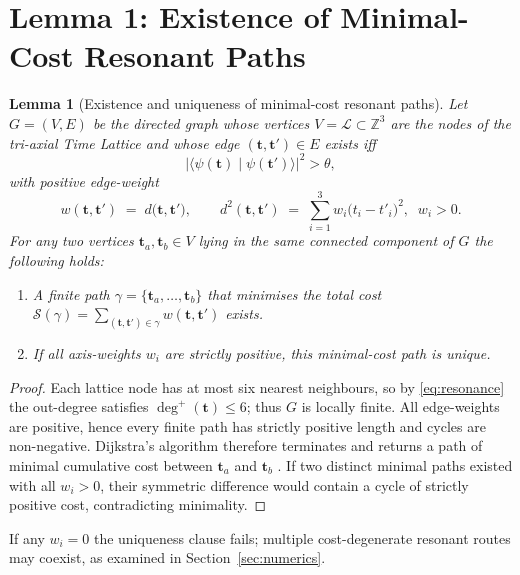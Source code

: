 \documentclass[11pt]{article}
\newtheorem{lemma}{Lemma}
\begin{document}
\section{Lemma 1: Existence of Minimal-Cost Resonant Paths}\label{sec:lemma1}

\begin{lemma}[Existence and uniqueness of minimal-cost resonant paths]\label{lem:minpath}
Let \(G=(V,E)\) be the directed graph whose vertices
\(V=\mathcal L\subset\mathbb Z^{3}\) are the nodes of the tri-axial Time Lattice and
whose edge \((\mathbf t,\mathbf t')\in E\) exists \emph{iff}
\begin{equation}
  \bigl|\langle\psi(\mathbf t)\mid\psi(\mathbf t')\rangle\bigr|^{2}>\theta,
  \label{eq:resonance}
\end{equation}
with positive edge-weight
\[
  w(\mathbf t,\mathbf t') \;=\; d\!\bigl(\mathbf t,\mathbf t'\bigr), 
  \qquad
  d^{2}(\mathbf t,\mathbf t')
  \;=\;
  \sum_{i=1}^{3} w_{i}\bigl(t_{i}-t'_{i}\bigr)^{2},
  \;\; w_{i}>0.
\]
For any two vertices \(\mathbf t_{a},\mathbf t_{b}\in V\) lying in the same
connected component of \(G\) the following holds:
\begin{enumerate}
  \item[(i)] A finite path \(\gamma=\{\mathbf t_{a},\dots,\mathbf t_{b}\}\) that
        minimises the total cost
        \(\mathcal S(\gamma)=\sum_{(\mathbf t,\mathbf t')\in\gamma}
        w(\mathbf t,\mathbf t')\) exists.
  \item[(ii)] If all axis-weights \(w_{i}\) are strictly positive, this
        minimal-cost path is unique.
\end{enumerate}
\end{lemma}

\begin{proof}
Each lattice node has at most six nearest neighbours, so by
\eqref{eq:resonance} the out-degree satisfies \(\deg^{+}(\mathbf t)\le 6\);
thus \(G\) is locally finite.  All edge-weights are positive, hence every
finite path has strictly positive length and cycles are non-negative.
Dijkstra’s algorithm therefore terminates and returns a path of minimal
cumulative cost between \(\mathbf t_{a}\) and \(\mathbf t_{b}\)
\cite{Dijkstra1959}.  If two distinct minimal paths existed with all
\(w_{i}>0\), their symmetric difference would contain a cycle of strictly
positive cost, contradicting minimality.
\end{proof}

If any \(w_{i}=0\) the uniqueness clause fails; multiple cost-degenerate
resonant routes may coexist, as examined in Section~\ref{sec:numerics}.
\end{document}

